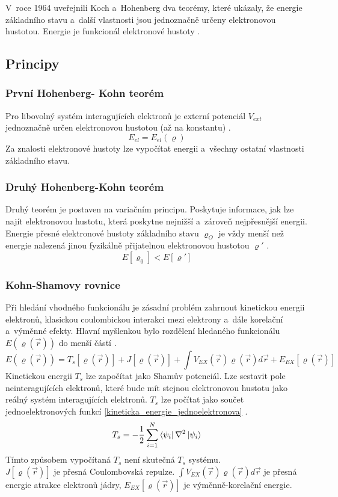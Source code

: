 \documentclass[
  printed, %
  table,   %
  lof,     %
  lot,     %
  oneside,
]{fithesis3}
\begin{document}
V~roce 1964 uveřejnili Koch a~Hohenberg dva teorémy, které ukázaly, že energie základního stavu  a~další vlastnosti jsou jednoznačně určeny elektronovou hustotou. Energie je funkcionál elektronové hustoty \cite{lechamolecularmodeling}.
\subsection{Principy}
\subsubsection{První Hohenberg- Kohn teorém}
Pro libovolný systém interagujících elektronů je externí potenciál $V_{ext}$ jednoznačně
určen elektronovou hustotou (až na konstantu) \cite{dftshrnutivysledky}.
\begin{equation}
E_{el} = E_{el} (\varrho)
\end{equation}
 Za znalosti elektronové hustoty lze vypočítat energii a~všechny ostatní vlastnosti základního stavu.
\subsubsection{Druhý Hohenberg-Kohn teorém}
Druhý teorém je postaven na variačním principu. Poskytuje informace, jak lze najít elektronovou hustotu, která poskytne nejnižší a~zároveň nejpřesnější energii.
\cite{koch2000chemist} 
Energie přesné elektronové hustoty základního stavu $\varrho_O$ je vždy menší  než energie nalezená jinou fyzikálně přijatelnou elektronovou hustotou $\varrho'$ \cite{Semradthesis}.
\begin{equation}
E [\varrho_0] < E[\varrho ']
\end{equation}

\subsubsection{Kohn-Shamovy rovnice}
Při hledání vhodného funkcionálu je zásadní problém zahrnout kinetickou energii elektronů, klasickou coulombickou interakci mezi elektrony a~dále korelační a~výměnné efekty. Hlavní myšlenkou bylo rozdělení hledaného funkcionálu $E(\varrho(\vec{r}))$ do menší částí \cite{koch2000chemist}.
\begin{equation}
E(\varrho(\vec{r})) = T_s[\varrho(\vec{r})] + J[\varrho(\vec{r})] + \int V_{EX}(\vec{r})\varrho(\vec{r})d\vec{r} + E_{EX}[\varrho(\vec{r})]
\end{equation}
 Kinetickou energii $T_s$ lze započítat jako Shamův potenciál. Lze sestavit pole neinteragujících elektronů, které bude mít stejnou elektronovou hustotu jako reálný systém interagujících elektronů. $T_{s}$ lze počítat jako součet jednoelektronových funkcí \ref{kineticka_energie_jednoelektronova} \cite{koch2000chemist}.
\begin{equation}
T_s = -\frac{1}{2} \sum_{i=1} ^{N}  \bra{\psi_i}{\nabla^{2}}\ket{\psi_i}
\label{kineticka_energie_jednoelektronova}
\end{equation}
Tímto způsobem vypočítaná $T_{s}$ není skutečná $T_{s}$ systému. \\
$J[\varrho(\vec{r})]$ je přesná Coulombovská repulze. $\int V_{EX}(\vec{r})\varrho(\vec{r})d\vec{r}$ je přesná energie atrakce elektronů jádry, $E_{EX}[\varrho(\vec{r})]$ je výměnně-korelační energie.
\end{document}

